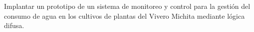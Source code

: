 Implantar un prototipo de un sistema de monitoreo y control para la gestión del 
consumo de agua en los cultivos de plantas del Vivero Michita mediante lógica difusa.